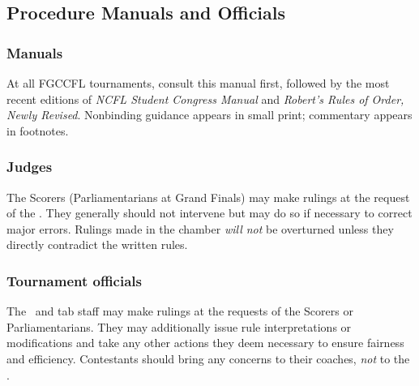 \subsection{Procedure Manuals and Officials}
\label{rule:authorities}

\subsubsection{Manuals}
At all FGCCFL tournaments, consult this manual first, 
followed by the most recent editions of 
\emph{NCFL Student Congress Manual} 
and 
\emph{Robert's Rules of Order, Newly Revised}.
Nonbinding guidance appears in {\footnotesize small print}; commentary appears in footnotes.


\subsubsection{Judges}
The Scorers (Parliamentarians at Grand Finals) may make rulings at the request of the \po. 
They generally should not intervene but may do so if necessary to correct major errors. 
Rulings made in the chamber \emph{will not} be overturned unless they directly contradict 
the written rules.

\subsubsection{Tournament officials}
The \cd\ and tab staff may make rulings at the requests of the Scorers or Parliamentarians. 
They may additionally issue rule interpretations or modifications and take any other actions they 
deem necessary to ensure fairness and efficiency.
Contestants should bring any concerns to their coaches, \emph{not} to the \cd.